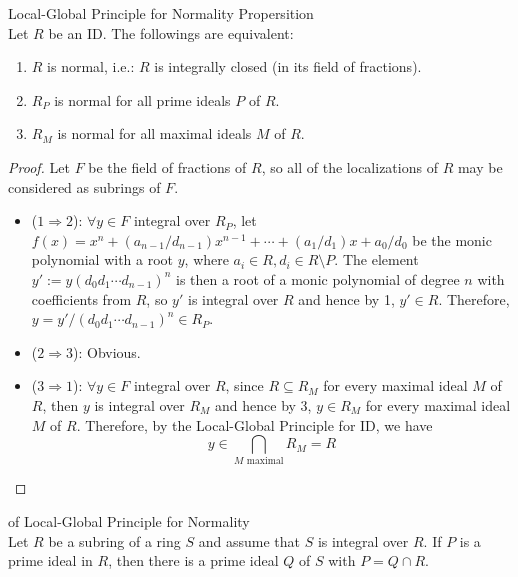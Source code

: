 \begin{proposition}{Local-Global Principle for Normality Propersition}\\
Let $R$ be an ID. The followings are equivalent:
\begin{enumerate}
    \item $R$ is normal, i.e.: $R$ is integrally closed (in its field of fractions).
    \item $R_P$ is normal for all prime ideals $P$ of $R$.
    \item $R_M$ is normal for all maximal ideals $M$ of $R$.
\end{enumerate}
\end{proposition}

\begin{proof}
    Let $F$ be the field of fractions of $R$, so all of the localizations of $R$ may be considered as subrings of $F$.
    \begin{itemize}
        \item ($1\Rightarrow2$): $\forall y\in F$ integral over $R_P$, let $f(x)= x^n+ (a_{n-1}/d_{n-1})x^{n-1} + \cdots +(a_1/d_1) x+a_0/d_0$ be the monic polynomial with a root $y$, where $a_i \in R,d_i \in R\setminus P$. The element $y':= y(d_0d_1 \cdots d_{n-1})^n$ is then a root of a monic polynomial of degree $n$ with coefficients from $R$, so $y'$ is integral over $R$ and hence by 1, $y'\in R$. Therefore, $y=y' /(d_0d_1 \cdots d_{n-1})^n \in R_P$.
        \item ($2\Rightarrow 3$): Obvious.
        \item ($3\Rightarrow 1$): $\forall y\in F$ integral over $R$, since $R \subseteq R_M$ for every maximal ideal $M$ of $R$, then $y$ is integral over $R_M$ and hence by 3, $y\in R_M$ for every maximal ideal $M$ of $R$. Therefore, by the Local-Global Principle for ID, we have
        $$y\in \bigcap_{M \text{ maximal}}R_M =R$$
    \end{itemize}
\end{proof}

\begin{corollary}{of Local-Global Principle for Normality}\\
Let $R$ be a subring of a ring $S$ and assume that $S$ is integral over $R$. If $P$ is a prime ideal in $R$, then there is a prime ideal $Q$ of $S$ with $P= Q\cap R$.
\end{corollary}

